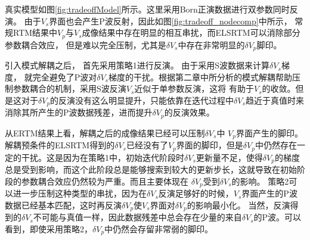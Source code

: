 真实模型如图\ref{fig:tradeoffModel}所示。这里采用Born正演数据进行双参数同时反演。
由于$V_s$界面也会产生P波反射，因此如图\ref{fig:tradeoff_nodecomp}中所示，
常规RTM结果中$V_p$与$V_s$成像结果中存在明显的相互串扰，而ELSRTM可以消除部分参数耦合效应，
但是难以完全压制，尤其是$\delta V_s$中存在非常明显的$\delta V_p$脚印。

引入模式解耦之后，
首先采用策略1进行反演。
由于采用S波数据来计算$\delta V_s$梯度，
就完全避免了P波对$\delta
V_s$梯度的干扰。根据第二章中所分析的模式解耦帮助压制参数耦合的机制，采用S波反演$V_s$近似于单参数反演，这将
有助于$V_s$的收敛。但是这对于$\delta
V_p$的反演没有这么明显提升，只能依靠在迭代过程中$\delta
V_s$趋近于真值时来消除其所产生的P波数据残差，进而提升$\delta V_p$的反演效果。

从ERTM结果上看，解耦之后的成像结果已经可以压制$\delta V_s$中
$V_p$界面产生的脚印。解耦预条件的ELSRTM得到的$\delta
V_s$已经没有了$V_p$界面的脚印，但是$\delta
V_p$中仍然存在一定的干扰。这是因为在策略1中，初始迭代阶段时$\delta
V_s$更新量不足，使得$\delta
V_p$的梯度总是受到影响，而这个此阶段总是能够搜索到较大的更新步长，这就导致在初始阶段的参数耦合效应仍然较为严重。而且主要体现在
$\delta V_p$受到$\delta V_s$的影响。
策略2可以进一步压制这种类型的串扰，因为在$\delta
V_s$反演足够好的时候，$V_s$界面产生的P波数据已经基本匹配，这时再反演$\delta
V_p$使$V_s$界面对$\delta V_p$的影响最小化。
当然，反演得到的$\delta V_s$不可能与真值一样，因此数据残差中总会存在少量的来自$\delta
V_s$的P波。可以看到，即使采用策略2，$\delta V_p$中仍然会存留非常弱的脚印。



